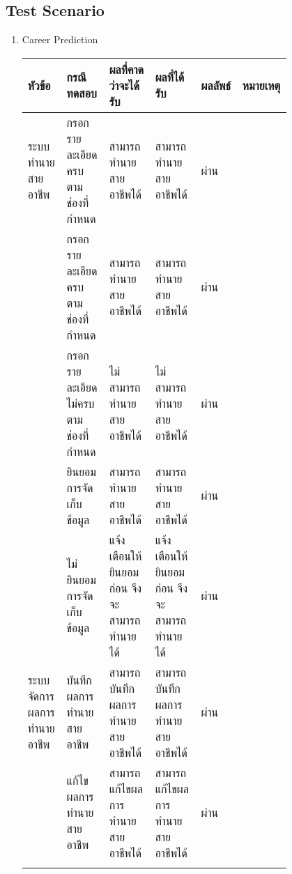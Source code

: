 \subsection{Test Scenario}
\begin{enumerate}
    \item Career Prediction
          \begin{longtable}{|>{\raggedright\arraybackslash}p{0.1\linewidth}|>{\raggedright\arraybackslash}p{0.15\linewidth}|>{\raggedright\arraybackslash}p{0.17\linewidth}|>{\raggedright\arraybackslash}p{0.17\linewidth}|>{\centering}p{0.1\linewidth}|>{\raggedright\arraybackslash}p{0.1\linewidth}|} \hline
              หัวข้อ                   & กรณีทดสอบ                              & ผลที่คาดว่าจะได้รับ                              & ผลที่ได้รับ                                     & ผลลัพธ์ & หมายเหตุ \\ \hline
              \endhead
              ระบบทำนายสายอาชีพ        & กรอกรายละเอียดครบตามช่องที่กำหนด           & สามารถทำนายสายอาชีพได้                         & สามารถทำนายสายอาชีพได้                         & ผ่าน   &         \\ \cline{2-6}& กรอกรายละเอียดครบตามช่องที่กำหนด           & สามารถทำนายสายอาชีพได้                         & สามารถทำนายสายอาชีพได้                         & ผ่าน   &         \\ \cline{2-6}
                                     & กรอกรายละเอียดไม่ครบตามช่องที่กำหนด         & ไม่สามารถทำนายสายอาชีพได้                       & ไม่สามารถทำนายสายอาชีพได้                       & ผ่าน   &         \\ \cline{2-6}
                                     & ยินยอมการจัดเก็บข้อมูล                     & สามารถทำนายสายอาชีพได้                         & สามารถทำนายสายอาชีพได้                         & ผ่าน   &         \\ \cline{2-6}
                                     & ไม่ยินยอมการจัดเก็บข้อมูล                   & แจ้งเตือนให้ยินยอมก่อน จึงจะสามารถทำนายได้          & แจ้งเตือนให้ยินยอมก่อน จึงจะสามารถทำนายได้          & ผ่าน   &         \\ \hline
              ระบบจัดการผลการทำนายอาชีพ & บันทึกผลการทำนายสายอาชีพ                  & สามารถบันทึกผลการทำนายสายอาชีพได้                & สามารถบันทึกผลการทำนายสายอาชีพได้                & ผ่าน   &         \\ \cline{2-6}
                                     & แก้ไขผลการทำนายสายอาชีพ                  & สามารถแก้ไขผลการทำนายสายอาชีพได้                & สามารถแก้ไขผลการทำนายสายอาชีพได้                & ผ่าน   &         \\ \cline{2-6}

\end{longtable}
\end{enumerate}
